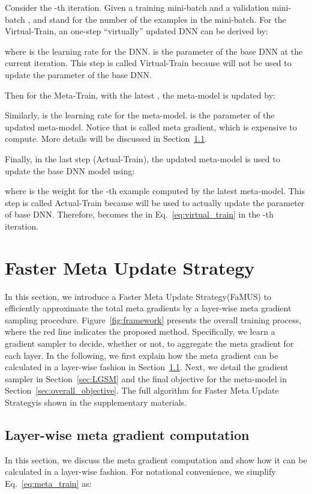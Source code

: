 \documentclass[final]{cvpr}
\newcommand{\methodname}{Faster Meta Update Strategy}
\newcommand{\methodnameabbre}{FaMUS}
\begin{document}
Consider the -th iteration. Given a training mini-batch  and a validation mini-batch ,  and  stand for the number of the examples in the mini-batch. 
For the Virtual-Train, an one-step ``virtually'' updated DNN can be derived by:

where  is the learning rate for the DNN.  is the parameter of the base DNN at the current iteration. This step is called Virtual-Train because  will not be used to update the parameter of the base DNN. 

Then for the Meta-Train, with the latest , the meta-model is updated by:

Similarly,  is the learning rate for the meta-model.  is the parameter of the updated meta-model.
Notice that  is called meta gradient, which is expensive to compute. More details will be discussed in Section~\ref{sec:slow_training}. 


Finally, in the last step (Actual-Train), the updated meta-model  is used to update the base DNN model using:

where  is the weight for the -th example computed by the latest meta-model. This step is called Actual-Train because  will be used to actually update the parameter of base DNN. Therefore,  becomes the  in Eq.~\eqref{eq:virtual_train} in the -th iteration. 


\section{\methodname}
In this section, we introduce a \methodname\space(\methodnameabbre) to efficiently approximate the total meta gradients by a layer-wise meta gradient sampling procedure. 
Figure~\ref{fig:framework} presents the overall training process, where the red line indicates the proposed method. Specifically, we learn a gradient sampler to decide, whether or not, to aggregate the meta gradient for each layer.
In the following, 
we first explain how the meta gradient can be calculated in a layer-wise fashion in Section~\ref{sec:slow_training}.
Next, we detail the gradient sampler in Section~\ref{sec:LGSM} and the final objective for the meta-model in Section~\ref{sec:overall_objective}. 
The full algorithm for \methodname\space is shown in the supplementary materials. 



\subsection{Layer-wise meta gradient computation}\label{sec:slow_training}
In this section, we discuss the meta gradient computation and show how it can be calculated in a layer-wise fashion.
For notational convenience, we simplify Eq.~\eqref{eq:meta_train} as:
\end{document}
